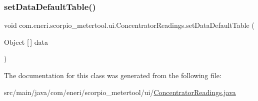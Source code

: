 \subsubsection{\texorpdfstring{set\+Data\+Default\+Table()}{setDataDefaultTable()}}
{\footnotesize\ttfamily void com.\+eneri.\+scorpio\+\_\+metertool.\+ui.\+Concentrator\+Readings.\+set\+Data\+Default\+Table (\begin{DoxyParamCaption}\item[{Object \mbox{[}$\,$\mbox{]}}]{data }\end{DoxyParamCaption})}



The documentation for this class was generated from the following file\+:\begin{DoxyCompactItemize}
\item 
src/main/java/com/eneri/scorpio\+\_\+metertool/ui/\hyperlink{_concentrator_readings_8java}{Concentrator\+Readings.\+java}\end{DoxyCompactItemize}
